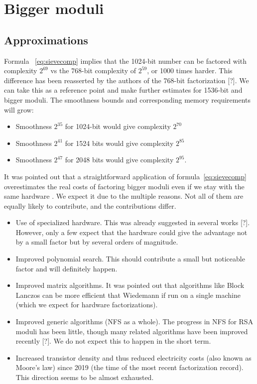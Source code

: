 \documentclass[a4paper]{article}
\begin{document}
\section{Bigger moduli}
\subsection{Approximations}\label{sec:approx}
Formula ~\eqref{eq:sievecomp} implies that the 1024-bit number can be factored with complexity $2^{69}$ vs the 768-bit complexity of $2^{59}$, or 1000 times harder. This difference has been reasserted by the authors of the 768-bit factorization [?]. We can take this as a reference point and make further estimates for 1536-bit and bigger moduli. The smoothness bounds and corresponding memory requirements will grow:
\begin{itemize}
    \item Smoothness $2^{35}$ for 1024-bit would give complexity $2^{70}$
    \item Smoothness $2^{41}$ for 1524 bits would give complexity $2^{85}$
    \item Smoothness $2^{47}$ for 2048 bits would give complexity $2^{95}$.
 \end{itemize}
 
It was pointed out that a straightforward application of formula~\eqref{eq:sievecomp} overestimates the real costs of factoring bigger moduli even if we stay with the same hardware \cite{DBLP:conf/eurocrypt/KleinjungDLPS17}. We expect it due to the multiple reasons. Not all of them are equally likely to contribute, and the contributions differ.
\begin{itemize}
    \item Use of specialized hardware. This was already suggested in several works [?]. However, only a few expect that the hardware could give the advantage not by a small factor but by several orders of magnitude.
    \item Improved polynomial search. This should contribute a small but noticeable factor and will definitely happen.
    \item Improved matrix algorithms. It was pointed out that algorithms like Block Lanczos can be more efficient that Wiedemann if run on a single machine (which we expect for hardware factorizations).
    \item Improved generic algorithms (NFS as a whole). The progress in NFS for RSA moduli has been little, though many related algorithms have been improved recently [?]. We do not expect this to happen in the short term.
    \item Increased transistor density and thus reduced electricity costs (also known as Moore's law) since 2019 (the time of the most recent factorization record). This direction seems to be almost exhausted.
\end{itemize}
 
\end{document}
